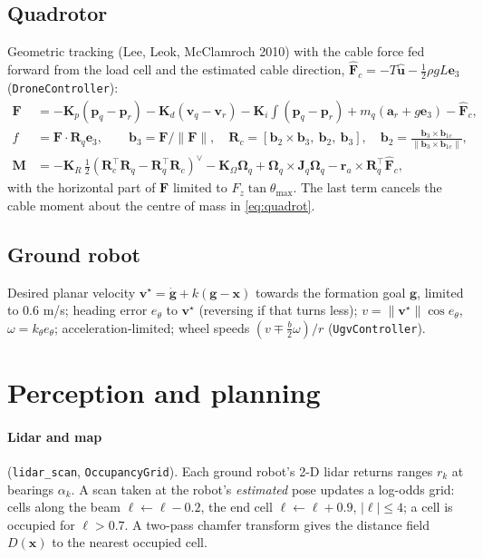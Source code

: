 \documentclass[11pt,a4paper]{article}
\newcommand{\T}{^{\!\top}}
\newcommand{\e}{\bm{e}}
\begin{document}
\subsection{Quadrotor}
Geometric tracking (Lee, Leok, McClamroch 2010) with the cable force fed forward from the load cell and the
estimated cable direction, $\hat{\bm F}_c=-T\hat{\bm u}-\tfrac12\rho gL\e_3$ (\texttt{DroneController}):
\begin{align}
 \bm F&=-\bm K_p(\bm p_q-\bm p_r)-\bm K_d(\bm v_q-\bm v_r)-\bm K_i\!\!\int\!(\bm p_q-\bm p_r)+m_q(\bm a_r+g\e_3)-\hat{\bm F}_c,\\
 f&=\bm F\!\cdot\!\bm R_q\e_3,\qquad \bm b_3=\bm F/\|\bm F\|,\quad\bm R_c=[\bm b_2\times\bm b_3,\ \bm b_2,\ \bm b_3],\quad \bm b_2=\frac{\bm b_3\times\bm b_{1c}}{\|\bm b_3\times\bm b_{1c}\|},\\
 \bm M&=-\bm K_R\,\tfrac12(\bm R_c\T\bm R_q-\bm R_q\T\bm R_c)^\vee-\bm K_\Omega\bm\Omega_q+\bm\Omega_q\times\bm J_q\bm\Omega_q-\bm r_a\times\bm R_q\T\hat{\bm F}_c ,
\end{align}
with the horizontal part of $\bm F$ limited to $F_z\tan\theta_{\max}$. The last term cancels the cable moment
about the centre of mass in \eqref{eq:quadrot}.

\subsection{Ground robot}
Desired planar velocity $\bm v^\star=\dot{\bm g}+k(\bm g-\bm x)$ towards the formation goal $\bm g$, limited to
0.6 m/s; heading error $e_\theta$ to $\bm v^\star$ (reversing if that turns less); $v=\|\bm v^\star\|\cos e_\theta$,
$\omega=k_\theta e_\theta$; acceleration-limited; wheel speeds $(v\mp\tfrac b2\omega)/r$ (\texttt{UgvController}).

\section{Perception and planning}\label{sec:plan}
\paragraph{Lidar and map} (\texttt{lidar\_scan}, \texttt{OccupancyGrid}). Each ground robot's 2-D lidar returns
ranges $r_k$ at bearings $\alpha_k$. A scan taken at the robot's \emph{estimated} pose updates a log-odds grid:
cells along the beam $\ell\leftarrow\ell-0.2$, the end cell $\ell\leftarrow\ell+0.9$, $|\ell|\le4$; a cell is
occupied for $\ell>0.7$. A two-pass chamfer transform gives the distance field $D(\bm x)$ to the nearest occupied
cell.
\end{document}
